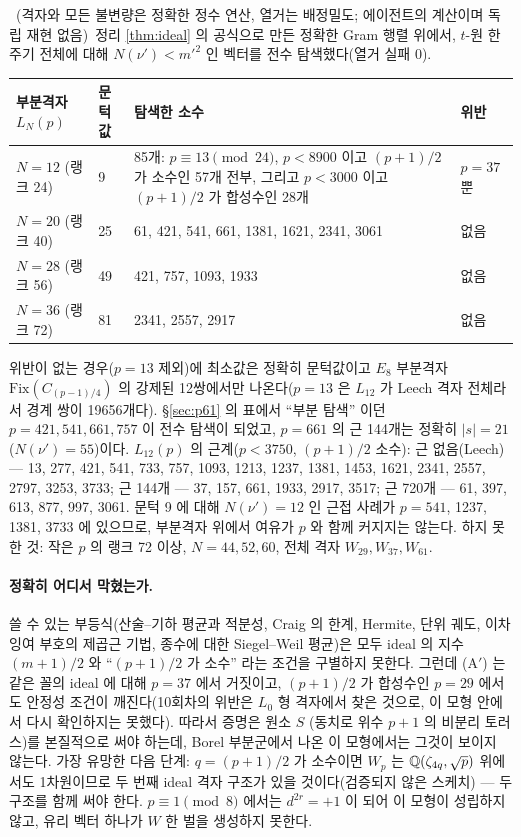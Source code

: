 \begin{observation}[20회차의 전수 탐색]\label{obs:r20scan}\tagN\ (격자와 모든 불변량은 정확한 정수 연산, 열거는 배정밀도; 에이전트의 계산이며 독립 재현 없음)\
정리 \ref{thm:ideal} 의 공식으로 만든 정확한 Gram 행렬 위에서, $t$-원 한 주기 전체에 대해 $N(\nu')<m'^2$ 인 벡터를 전수 탐색했다(열거 실패 0).
\begin{center}\small
\begin{tabular}{@{}llp{8.6cm}l@{}}
\toprule
부분격자 $L_N(p)$ & 문턱값 & 탐색한 소수 & 위반\\
\midrule
$N=12$ (랭크 24) & 9 & 85개: $p\equiv13\pmod{24}$, $p<8900$ 이고 $(p+1)/2$ 가 소수인 57개 전부, 그리고 $p<3000$ 이고 $(p+1)/2$ 가 합성수인 28개 & $p=37$ 뿐\\
$N=20$ (랭크 40) & 25 & 61, 421, 541, 661, 1381, 1621, 2341, 3061 & 없음\\
$N=28$ (랭크 56) & 49 & 421, 757, 1093, 1933 & 없음\\
$N=36$ (랭크 72) & 81 & 2341, 2557, 2917 & 없음\\
\bottomrule
\end{tabular}
\end{center}
위반이 없는 경우($p=13$ 제외)에 최소값은 정확히 문턱값이고 $E_8$ 부분격자 $\mathrm{Fix}(C_{(p-1)/4})$ 의 강제된 12쌍에서만 나온다($p=13$ 은 $L_{12}$ 가 Leech 격자 전체라서 경계 쌍이 19656개다). \S\ref{sec:p61} 의 표에서 ``부분 탐색'' 이던 $p=421,541,661,757$ 이 전수 탐색이 되었고, $p=661$ 의 근 144개는 정확히 $|s|=21$ ($N(\nu')=55$)이다. $L_{12}(p)$ 의 근계($p<3750$, $(p+1)/2$ 소수): 근 없음(Leech) --- 13, 277, 421, 541, 733, 757, 1093, 1213, 1237, 1381, 1453, 1621, 2341, 2557, 2797, 3253, 3733; 근 144개 --- 37, 157, 661, 1933, 2917, 3517; 근 720개 --- 61, 397, 613, 877, 997, 3061. 문턱 9 에 대해 $N(\nu')=12$ 인 근접 사례가 $p=541$, 1237, 1381, 3733 에 있으므로, 부분격자 위에서 여유가 $p$ 와 함께 커지지는 않는다. 하지 못한 것: 작은 $p$ 의 랭크 72 이상, $N=44,52,60$, 전체 격자 $W_{29},W_{37},W_{61}$.
\end{observation}

\paragraph{정확히 어디서 막혔는가.} 쓸 수 있는 부등식(산술--기하 평균과 적분성, Craig 의 한계, Hermite, 단위 궤도, 이차잉여 부호의 제곱근 기법, 종수에 대한 Siegel--Weil 평균)은 모두 ideal 의 지수 $(m+1)/2$ 와 ``$(p+1)/2$ 가 소수'' 라는 조건을 구별하지 못한다. 그런데 (A$'$) 는 같은 꼴의 ideal 에 대해 $p=37$ 에서 거짓이고, $(p+1)/2$ 가 합성수인 $p=29$ 에서도 안정성 조건이 깨진다(10회차의 위반은 $L_0$ 형 격자에서 찾은 것으로, 이 모형 안에서 다시 확인하지는 못했다). 따라서 증명은 원소 $S$ (동치로 위수 $p+1$ 의 비분리 토러스)를 본질적으로 써야 하는데, Borel 부분군에서 나온 이 모형에서는 그것이 보이지 않는다. 가장 유망한 다음 단계: $q=(p+1)/2$ 가 소수이면 $W_p$ 는 $\mathbb{Q}(\zeta_{4q},\sqrt p)$ 위에서도 1차원이므로 두 번째 ideal 격자 구조가 있을 것이다(검증되지 않은 스케치) --- 두 구조를 함께 써야 한다. $p\equiv1\pmod8$ 에서는 $d^{2r}=+1$ 이 되어 이 모형이 성립하지 않고, 유리 벡터 하나가 $W$ 한 벌을 생성하지 못한다.

